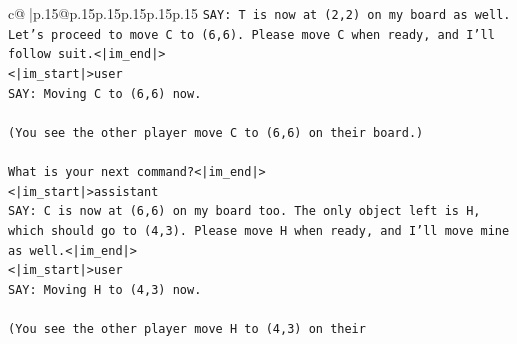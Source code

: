 \documentclass{article}
\begin{document}
{\begin{supertabular}{c@{$\;$}|p{.15\linewidth}@{}p{.15\linewidth}p{.15\linewidth}p{.15\linewidth}p{.15\linewidth}p{.15\linewidth}}
{{{\texttt{SAY: T is now at (2,2) on my board as well. Let's proceed to move C to (6,6). Please move C when ready, and I'll follow suit.<|im\_end|>} \\
\texttt{<|im\_start|>user} \\
\texttt{SAY: Moving C to (6,6) now.} \\
\\ 
\texttt{(You see the other player move C to (6,6) on their board.)} \\
\\ 
\texttt{What is your next command?<|im\_end|>} \\
\texttt{<|im\_start|>assistant} \\
\texttt{SAY: C is now at (6,6) on my board too. The only object left is H, which should go to (4,3). Please move H when ready, and I'll move mine as well.<|im\_end|>} \\
\texttt{<|im\_start|>user} \\
\texttt{SAY: Moving H to (4,3) now.} \\
\\ 
\texttt{(You see the other player move H to (4,3) on their} \\
            }
        }
    }
     \\ \\


\end{supertabular}}
\end{document}
